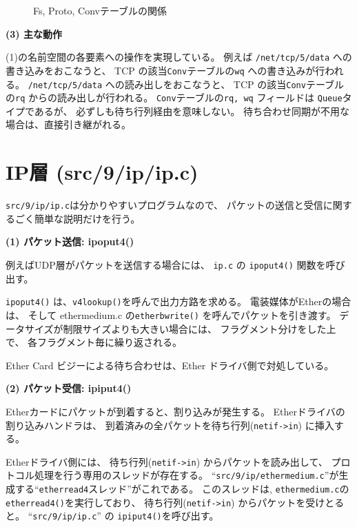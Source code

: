 \begin{figure}[htb]
  \begin{center}
   \epsfxsize=440pt
    \caption{Fs, Proto, Convテーブルの関係}
    \label{fig:FsProtoConv}
  \end{center}
\end{figure}


{\bf \flushleft(3) 主な動作}

(1)の名前空間の各要素への操作を実現している。
例えば \verb|/net/tcp/5/data| への書き込みをおこなうと、
TCP の該当{\tt Conv}テーブルの{\tt wq} への書き込みが行われる。
 \verb|/net/tcp/5/data| への読み出しをおこなうと、
TCP の該当{\tt Conv}テーブルの{\tt rq} からの読み出しが行われる。
{\tt Conv}テーブルの{\tt rq, wq} フィールドは {\tt Queue}タイプであるが、
必ずしも待ち行列経由を意味しない。
待ち合わせ同期が不用な場合は、直接引き継がれる。




\section{IP層 (src/9/ip/ip.c)}

{\tt src/9/ip/ip.c}は分かりやすいプログラムなので、
パケットの送信と受信に関するごく簡単な説明だけを行う。

{\bf \flushleft(1) パケット送信: ipoput4()}

例えばUDP層がパケットを送信する場合には、
{\tt ip.c} の \verb|ipoput4()| 関数を呼び出す。

 \verb|ipoput4()| は、\verb|v4lookup()|を呼んで出力方路を求める。
電装媒体がEtherの場合は、
そして ethermedium.c の\verb|etherbwrite()| を呼んでパケットを引き渡す。
データサイズが制限サイズよりも大きい場合には、
フラグメント分けをした上で、
各フラグメント毎に繰り返される。

Ether Card ビジーによる待ち合わせは、Ether ドライバ側で対処している。


{\bf \flushleft(2) パケット受信: ipiput4()}

Etherカードにパケットが到着すると、割り込みが発生する。
Etherドライバの割り込みハンドラは、
到着済みの全パケットを待ち行列(\verb|netif->in|) に挿入する。

Etherドライバ側には、
待ち行列(\verb|netif->in|) からパケットを読み出して、
プロトコル処理を行う専用のスレッドが存在する。
``{\tt src/9/ip/ethermedium.c}''が生成する``{\tt etherread4}スレッド''がこれである。
このスレッドは, {\tt ethermedium.c}の \verb|etherread4()|を実行しており、
待ち行列(\verb|netif->in|) からパケットを受けとると。
``{\tt src/9/ip/ip.c}'' の \verb|ipiput4()|を呼び出す。

